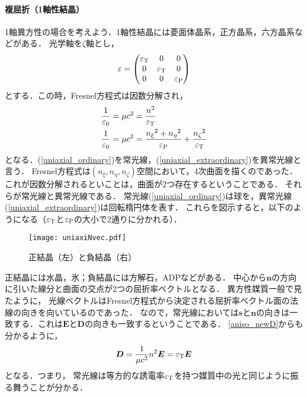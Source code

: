 \paragraph{複屈折（1軸性結晶）}
1軸異方性の場合を考えよう．1軸性結晶には菱面体晶系，正方晶系，六方晶系などがある．
光学軸を$\zeta$軸とし，
\begin{align}
  \varepsilon=
  \begin{pmatrix}
    \varepsilon_{\text T} & 0 & 0\\
    0 & \varepsilon_{\text T} & 0\\
    0 & 0 & \varepsilon_{\text P}
  \end{pmatrix}
  \label{uniaxial_tensor1}
\end{align}
とする．この時，Fresnel方程式は因数分解され，
\begin{align}
  \dfrac{1}{\varepsilon_0}=\mu{c}^2&=\dfrac{n^2}{\varepsilon_{\text T}}\label{uniaxial_ordinary}\\
  \dfrac{1}{\varepsilon_0}=\mu{c}^2&=\dfrac{{n_\xi}^2+{n_\eta}^2}{\varepsilon_{\text P}}+\dfrac{{n_\zeta}^2}{\varepsilon_{\text T}}\label{uniaxial_extraordinary}
\end{align}
となる．(\ref{uniaxial_ordinary})を常光線，(\ref{uniaxial_extraordinary})を異常光線と言う．
Fresnel方程式は$(n_\xi,n_\eta,n_\zeta)$空間において，4次曲面を描くのであった．
これが因数分解されるといことは，曲面が2つ存在するということである．
それらが常光線と異常光線である．
常光線(\ref{uniaxial_ordinary})は球を，異常光線(\ref{uniaxial_extraordinary})は回転楕円体を表す．
これらを図示すると，以下のようになる（$\varepsilon_{\text T}$と$\varepsilon_{\text P}$の大小で2通りに分かれる）．

\begin{figure}[ht]
  \centering
  \texttt{[image: uniaxiNvec.pdf]}
  \caption{正結晶（左）と負結晶（右）}
  \label{uniaxiNvec}
\end{figure}

正結晶には水晶，氷；負結晶には方解石，ADPなどがある．
中心から$\boldsymbol{n}$の方向に引いた線分と曲面の交点が2つの屈折率ベクトルとなる．
異方性媒質一般で見たように，
光線ベクトルはFresnel方程式から決定される屈折率ベクトル面の法線の向きを向いているのであった．
なので，常光線においては$\boldsymbol{s}$と$\boldsymbol{n}$の向きは一致する．これは$\boldsymbol{E}$と$\boldsymbol{D}$の向きも一致するということである．
\eqref{aniso_newD}からも分かるように，
\begin{align}
  \boldsymbol{D}=\dfrac{1}{\mu{c^2}}n^2\boldsymbol{E}=\varepsilon_{\text T}\boldsymbol{E}
\end{align}
となる．つまり，
常光線は等方的な誘電率$\varepsilon_{\text T}$を持つ媒質中の光と同じように振る舞うことが分かる．

